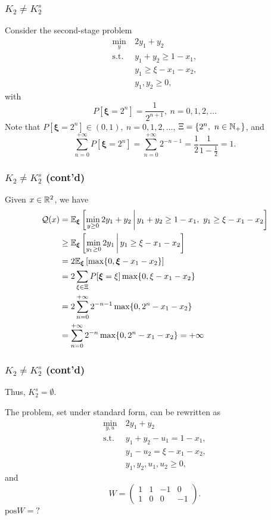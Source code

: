 \documentclass{beamer}
\def\bxi{\boldsymbol\xi}
\def\bxi{\boldsymbol\xi}
\begin{document}
\begin{frame}
\frametitle{$K_2 \ne K_2^s$}

Consider the second-stage problem
\begin{align*}
	\min_y\ & 2y_1+y_2\\
	\mbox{s.t. } & y_1 + y_2 \geq 1 - x_1,\\
	& y_1 \geq \xi - x_1 - x_2,\\
	& y_1, y_2 \geq 0,
\end{align*}
with
$$
P\left[ \bxi = 2^n \right] = \frac{1}{2^{n+1}},\ n = 0,1,2,\ldots
$$
Note that $P\left[ \bxi = 2^n \right] \in (0,1),\ n = 0,1,2,\ldots$, $\Xi = \lbrace 2^n,\ n \in {\mathbb{N}}_+ \rbrace$, and
$$
\sum_{n=0}^{+\infty} P\left[ \bxi = 2^n \right] = \sum_{n=0}^{+\infty} 2^{-n-1} = \frac{1}{2} \frac{1}{1-\frac{1}{2}} = 1.
$$

\end{frame}

\begin{frame}
\frametitle{$K_2 \ne K_2^s$ (cont'd)}

Given $x \in {\mathbb{R}}^2$, we have
\begin{align*}
\calQ(x) &= \EE_{\bxi} \left[ \min_{y \geq 0} 2y_1+y_2 \,\bigg|\, y_1 + y_2 \geq 1 - x_1,\ y_1 \geq \xi - x_1 - x_2 \right] \\
&\geq \EE_{\bxi} \left[ \min_{y_1 \geq 0} 2y_1 \,\bigg|\, y_1 \geq \xi - x_1 - x_2 \right] \\
& = 2 \EE_{\bxi} \left[ \max \{ 0, \bxi - x_1 - x_2 \}\right] \\
& = 2 \sum_{\xi \in \Xi} P[\bxi = \xi] \max \{ 0, \xi - x_1 - x_2 \} \\
& = 2 \sum_{n = 0}^{+\infty} 2^{-n-1} \max \{ 0, 2^n - x_1 - x_2 \} \\
& = \sum_{n = 0}^{+\infty} 2^{-n} \max \{ 0, 2^n - x_1 - x_2 \} = +\infty
\end{align*}

\end{frame}

\begin{frame}
\frametitle{$K_2 \ne K_2^s$ (cont'd)}

Thus, $K_2^s = \emptyset$.

\mbox{}

The problem, set under standard form, can be rewritten as
\begin{align*}
	\min_{y,u}\ & 2y_1+y_2\\
	\mbox{s.t. } & y_1 + y_2 - u_1 = 1 - x_1,\\
	& y_1 -u_2 = \xi - x_1 - x_2,\\
	& y_1, y_2, u_1, u_2 \geq 0,
\end{align*}
and
$$
W = \begin{pmatrix}
 1 & 1 & -1 & 0 \\ 1 & 0 & 0 & -1
\end{pmatrix}.
$$
$\text{pos} W = ?$

\end{frame}
\end{document}
